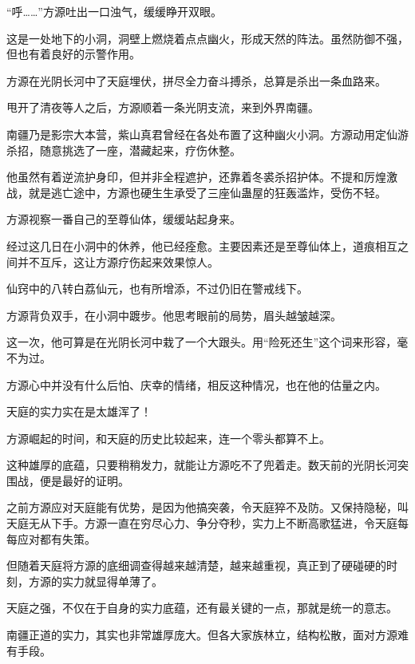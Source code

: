 
\begin{this_body}



“呼……”方源吐出一口浊气，缓缓睁开双眼。

这是一处地下的小洞，洞壁上燃烧着点点幽火，形成天然的阵法。虽然防御不强，但也有着良好的示警作用。

方源在光阴长河中了天庭埋伏，拼尽全力奋斗搏杀，总算是杀出一条血路来。

甩开了清夜等人之后，方源顺着一条光阴支流，来到外界南疆。

南疆乃是影宗大本营，紫山真君曾经在各处布置了这种幽火小洞。方源动用定仙游杀招，随意挑选了一座，潜藏起来，疗伤休整。

他虽然有着逆流护身印，但并非全程遮护，还靠着冬裘杀招护体。不提和厉煌激战，就是逃亡途中，方源也硬生生承受了三座仙蛊屋的狂轰滥炸，受伤不轻。

方源视察一番自己的至尊仙体，缓缓站起身来。

经过这几日在小洞中的休养，他已经痊愈。主要因素还是至尊仙体上，道痕相互之间并不互斥，这让方源疗伤起来效果惊人。

仙窍中的八转白荔仙元，也有所增添，不过仍旧在警戒线下。

方源背负双手，在小洞中踱步。他思考眼前的局势，眉头越皱越深。

这一次，他可算是在光阴长河中栽了一个大跟头。用“险死还生”这个词来形容，毫不为过。

方源心中并没有什么后怕、庆幸的情绪，相反这种情况，也在他的估量之内。

天庭的实力实在是太雄浑了！

方源崛起的时间，和天庭的历史比较起来，连一个零头都算不上。

这种雄厚的底蕴，只要稍稍发力，就能让方源吃不了兜着走。数天前的光阴长河突围战，便是最好的证明。

之前方源应对天庭能有优势，是因为他搞突袭，令天庭猝不及防。又保持隐秘，叫天庭无从下手。方源一直在穷尽心力、争分夺秒，实力上不断高歌猛进，令天庭每每应对都有失策。

但随着天庭将方源的底细调查得越来越清楚，越来越重视，真正到了硬碰硬的时刻，方源的实力就显得单薄了。

天庭之强，不仅在于自身的实力底蕴，还有最关键的一点，那就是统一的意志。

南疆正道的实力，其实也非常雄厚庞大。但各大家族林立，结构松散，面对方源难有手段。


\end{this_body}
